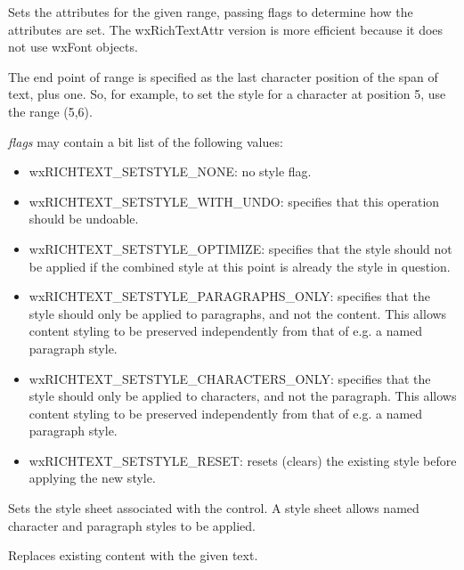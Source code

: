 Sets the attributes for the given range, passing flags to determine how the attributes are set. The wxRichTextAttr version is more efficient
because it does not use wxFont objects.

The end point of range is specified as the last character position of the span of text, plus one.
So, for example, to set the style for a character at position 5, use the range (5,6).

{\it flags} may contain a bit list of the following values:

\begin{itemize}\itemsep=0pt
\item wxRICHTEXT\_SETSTYLE\_NONE: no style flag.
\item wxRICHTEXT\_SETSTYLE\_WITH\_UNDO: specifies that this operation should be undoable.
\item wxRICHTEXT\_SETSTYLE\_OPTIMIZE: specifies that the style should not be applied if the
combined style at this point is already the style in question.
\item wxRICHTEXT\_SETSTYLE\_PARAGRAPHS\_ONLY: specifies that the style should only be applied to paragraphs,
and not the content. This allows content styling to be preserved independently from that of e.g. a named paragraph style.
\item wxRICHTEXT\_SETSTYLE\_CHARACTERS\_ONLY: specifies that the style should only be applied to characters,
and not the paragraph. This allows content styling to be preserved independently from that of e.g. a named paragraph style.
\item wxRICHTEXT\_SETSTYLE\_RESET: resets (clears) the existing style before applying the new style.
\end{itemize}

\label{wxrichtextctrlsetstylesheet}


Sets the style sheet associated with the control. A style sheet allows named
character and paragraph styles to be applied.

\label{wxrichtextctrlsetvalue}


Replaces existing content with the given text.

\label{wxrichtextctrlsetupscrollbars}

